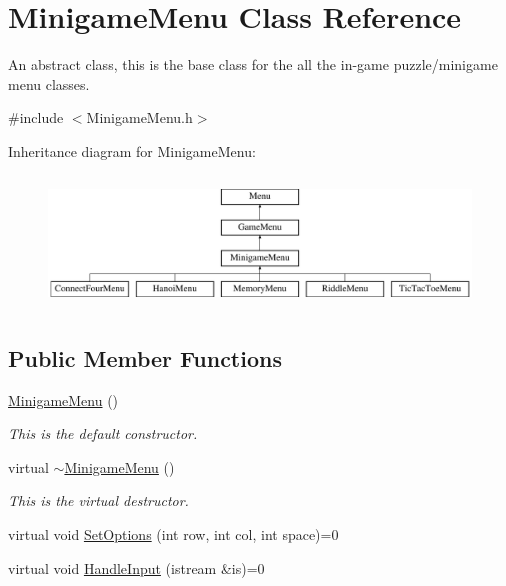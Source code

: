 \hypertarget{classMinigameMenu}{\section{Minigame\-Menu Class Reference}
\label{classMinigameMenu}
}


An abstract class, this is the base class for the all the in-\/game puzzle/minigame menu classes.  




{\ttfamily \#include $<$Minigame\-Menu.\-h$>$}

Inheritance diagram for Minigame\-Menu\-:\begin{figure}[H]
\begin{center}
\leavevmode
\includegraphics[height=3.555556cm]{classMinigameMenu}
\end{center}
\end{figure}
\subsection*{Public Member Functions}
\begin{DoxyCompactItemize}
\item 
\hyperlink{classMinigameMenu_a90d42578d68f68c3b26c414f90f2d950}{Minigame\-Menu} ()
\begin{DoxyCompactList}\small\item\em This is the default constructor. \end{DoxyCompactList}\item 
virtual \hyperlink{classMinigameMenu_a6b8621ca44319d6b2759766bdca9cbf9}{$\sim$\-Minigame\-Menu} ()
\begin{DoxyCompactList}\small\item\em This is the virtual destructor. \end{DoxyCompactList}\item 
virtual void \hyperlink{classMinigameMenu_abde3ae319bf1660a8626c6f765e054a8}{Set\-Options} (int row, int col, int space)=0
\item 
virtual void \hyperlink{classMinigameMenu_a3f854c4eefb0f3110cd085b3cfe56460}{Handle\-Input} (istream \&is)=0
\end{DoxyCompactItemize}

